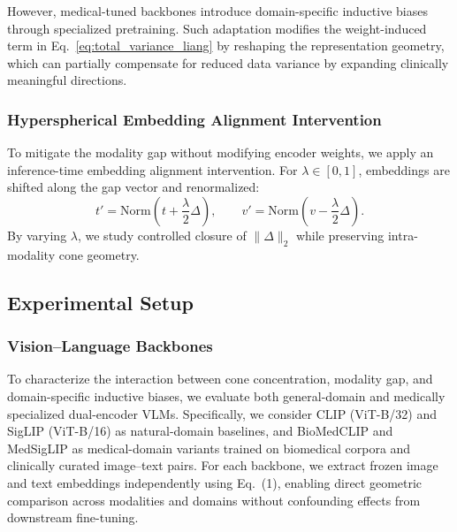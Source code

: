 \documentclass[runningheads]{llncs}
\begin{document}

However, medical-tuned backbones introduce domain-specific inductive biases through specialized pretraining. Such adaptation modifies the weight-induced term in Eq.~\ref{eq:total_variance_liang} by reshaping the representation geometry, which can partially compensate for reduced data variance by expanding clinically meaningful directions. 



\subsubsection{Hyperspherical Embedding Alignment Intervention}
\label{sec:alignment}

To mitigate the modality gap without modifying encoder weights, we apply an inference-time embedding alignment intervention. For $\lambda\in[0,1]$, embeddings are shifted along the gap vector and renormalized:
\begin{equation}
t'=\mathrm{Norm}\!\left(t+\frac{\lambda}{2}\Delta\right),
\qquad
v'=\mathrm{Norm}\!\left(v-\frac{\lambda}{2}\Delta\right).
\label{eq:alignment}
\end{equation}
By varying $\lambda$, we study controlled closure of $\|\Delta\|_2$ while preserving intra-modality cone geometry.


\subsection{Experimental Setup}
\label{sec:experimental_setup}

\subsubsection{Vision--Language Backbones}
\label{sec:backbones}

To characterize the interaction between cone concentration, modality gap, and domain-specific inductive biases, we evaluate both general-domain and medically specialized dual-encoder VLMs. Specifically, we consider CLIP (ViT-B/32) and SigLIP (ViT-B/16) as natural-domain baselines, and BioMedCLIP and MedSigLIP as medical-domain variants trained on biomedical corpora and clinically curated image--text pairs. For each backbone, we extract frozen image and text embeddings independently using Eq.~(1), enabling direct geometric comparison across modalities and domains without confounding effects from downstream fine-tuning.
\end{document}
